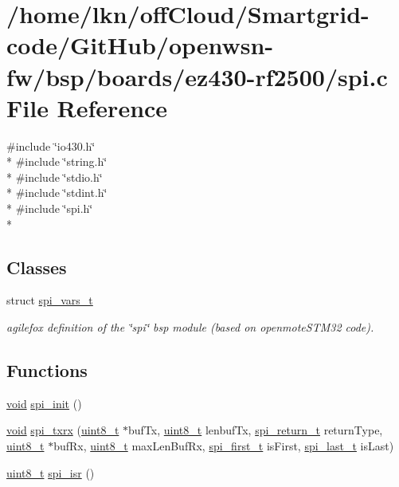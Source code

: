 \hypertarget{ez430-rf2500_2spi_8c}{}\section{/home/lkn/off\+Cloud/\+Smartgrid-\/code/\+Git\+Hub/openwsn-\/fw/bsp/boards/ez430-\/rf2500/spi.c File Reference}
\label{ez430-rf2500_2spi_8c}
{\ttfamily \#include \char`\"{}io430.\+h\char`\"{}}\\*
{\ttfamily \#include \char`\"{}string.\+h\char`\"{}}\\*
{\ttfamily \#include \char`\"{}stdio.\+h\char`\"{}}\\*
{\ttfamily \#include \char`\"{}stdint.\+h\char`\"{}}\\*
{\ttfamily \#include \char`\"{}spi.\+h\char`\"{}}\\*
\subsection*{Classes}
\begin{DoxyCompactItemize}
\item 
struct \hyperlink{structspi__vars__t}{spi\+\_\+vars\+\_\+t}
\begin{DoxyCompactList}\small\item\em agilefox definition of the \char`\"{}spi\char`\"{} bsp module (based on openmote\+S\+T\+M32 code). \end{DoxyCompactList}\end{DoxyCompactItemize}
\subsection*{Functions}
\begin{DoxyCompactItemize}
\item 
\hyperlink{usb__devapi_8h_afabf60e7f57651d6d595a02c75f07cd0}{void} \hyperlink{ez430-rf2500_2spi_8c_a5db0aceecaf7db5fbe2984e88fef3734}{spi\+\_\+init} ()
\item 
\hyperlink{usb__devapi_8h_afabf60e7f57651d6d595a02c75f07cd0}{void} \hyperlink{ez430-rf2500_2spi_8c_ac2fb3e956c783d2d4d5e7e418aa6fff0}{spi\+\_\+txrx} (\hyperlink{_p_e___types_8h_aba7bc1797add20fe3efdf37ced1182c5}{uint8\+\_\+t} $\ast$buf\+Tx, \hyperlink{_p_e___types_8h_aba7bc1797add20fe3efdf37ced1182c5}{uint8\+\_\+t} lenbuf\+Tx, \hyperlink{spi_8h_acc3b28d69cd1e029d05f77aa7d1ede06}{spi\+\_\+return\+\_\+t} return\+Type, \hyperlink{_p_e___types_8h_aba7bc1797add20fe3efdf37ced1182c5}{uint8\+\_\+t} $\ast$buf\+Rx, \hyperlink{_p_e___types_8h_aba7bc1797add20fe3efdf37ced1182c5}{uint8\+\_\+t} max\+Len\+Buf\+Rx, \hyperlink{spi_8h_af5f18ca9b261f81e8649655fa1bdb3a2}{spi\+\_\+first\+\_\+t} is\+First, \hyperlink{spi_8h_a6a8a77d768dca340b71324f2aec66a97}{spi\+\_\+last\+\_\+t} is\+Last)
\item 
\hyperlink{_p_e___types_8h_aba7bc1797add20fe3efdf37ced1182c5}{uint8\+\_\+t} \hyperlink{ez430-rf2500_2spi_8c_a238c39026da22c5155398b15dd8df5d7}{spi\+\_\+isr} ()
\end{DoxyCompactItemize}
